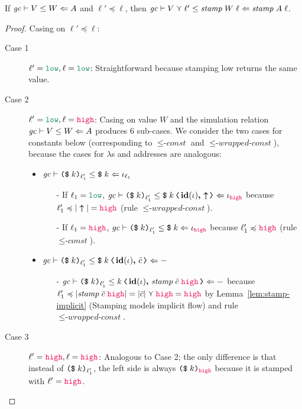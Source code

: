 \begin{lemma}
\label{lem:sim-stamp}
If ${\mathit{gc}}\vdash{V}\leq{W}\Leftarrow{A}$ and $\ell' \preccurlyeq \ell$, then
${\mathit{gc}}\vdash{V \curlyvee \ell'}\leq{\mathit{stamp}\;W\;\ell}\Leftarrow{\mathit{stamp}\;A\;\ell}$.
\end{lemma}
\begin{proof}
Casing on $\ell' \preccurlyeq \ell$:
\begin{description}
\item[Case 1] $\ell'=\low, \ell=\low$: Straightforward because stamping low returns the same value.
\item[Case 2] $\ell'=\low, \ell=\high$: Casing on value $W$ and the simulation relation ${\mathit{gc}}\vdash{V}\leq{W}\Leftarrow{A}$
produces 6 sub-cases. We consider the two cases for constants below (corresponding to ${\leq}\textit{-const}$ and
${\leq}\textit{-wrapped-const}$), because the cases for $\lambda$s and addresses are analogous:
\begin{itemize}
\item ${\mathit{gc}}\vdash{\ensuremath{\text{\texttt{{(\$}}}\;{k}\text{\texttt{{)}}}_{\ell_1'}}}\leq{\ensuremath{\text{\texttt{{\$}}}\;{k}}}\Leftarrow{\iota_{\ell_1}}$
      \begin{itemize}
      \item[-] If $\ell_1 = \low$, $\simrel{\gc}{\dynconst{k}{\ell_1'}}{\cccast{\ccconst{k}}{\coerc{\id{\iota}}{\up}}}{\iota_{\high}}$
      because $\ell_1' \preccurlyeq |\up| = \high$ (rule ${\leq}\textit{-wrapped-const}$).
      \item[-] If $\ell_1 = \high$, $\simrel{\gc}{\dynconst{k}{\ell_1'}}{\ccconst{k}}{\iota_{\high}}$
      because $\ell_1' \preccurlyeq \high$ (rule ${\leq}\textit{-const}$).
      \end{itemize}
\item $\simrel{\gc}{\dynconst{k}{\ell_1'}}{\cccast{\ccconst{k}}{\coerc{\id{\iota}}{\bar{c}}}}{-}$
      \begin{itemize}
      \item[-]
        $\simrel{\gc}{\dynconst{k}{\ell_1'}}{\cccast{k}{\coerc{\id{\iota}}{\mathit{stamp}\;\bar{c}\;\high}}}{-}$
        because \newline $\ell_1' \preccurlyeq |\mathit{stamp}\;\bar{c}\;\high|
        = |\bar{c}| \curlyvee \high = \high$ by Lemma~\ref{lem:stamp-implicit}
        (Stamping models implicit flow) and rule
        ${\leq}\textit{-wrapped-const}$.
      \end{itemize}
\end{itemize}
\item[Case 3] $\ell'=\high, \ell=\high$: Analogous to Case 2; the only difference is that
           instead of $\text{\texttt{{(\$}}}\;{k}\text{\texttt{{)}}}_{\ell_1'}$, the left side is always $\dynconst{k}{\high}$
           because it is stamped with $\ell' = \high$.
\end{description}
\end{proof}

